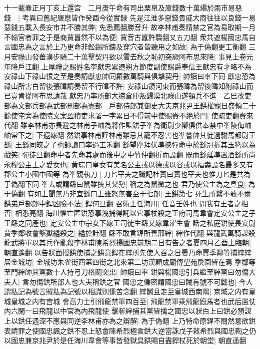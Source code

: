 十一載春正月丁亥上還宫　二月庚午命有司出粟帛及庫錢數十萬緡於兩市易惡錢　|{
	考異曰舊紀唐㦄皆作癸酉今從實録}
先是江淮多惡錢貴戚大商往往以良錢一易惡錢五載入長安市井不勝其弊|{
	先悉薦翻勝音升}
故李林甫奏請禁之官為易取期一月不輸官者罪之于是商賈囂然不以為便|{
	賈音古囂許驕翻又五刀翻}
衆共遮楊國忠馬自言國忠為之言於上乃更命非鈆錫所鑄及穿穴者皆聽用之如故|{
	為于偽翻更工衡翻}
三月安祿山發蕃漢步騎二十萬擊契丹欲以雪去秋之恥初突厥阿布思來降|{
	事見上卷元年降戶江翻}
上厚禮之賜姓名李獻忠累遷朔方節度副使賜爵奉信王獻忠有才略不為安祿山下祿山恨之至是奏請獻忠帥同羅數萬騎與俱擊契丹|{
	帥讀曰率下同}
獻忠恐為祿山所害白留後張暐請奏留不行暐不許|{
	安祿山領河東而張暐為留後暐知附祿山而已豈肯從阿布思請哉}
獻忠乃率所部大掠倉庫叛歸漠北祿山遂頓兵不進　乙巳改吏部為文部兵部為武部刑部為憲部　戶部侍郎兼御史大夫京兆尹王鉷權寵日盛領二十餘使宅旁為使院文案盈積吏求署一字累日不得前中使賜賚不絶於門|{
	使疏吏翻賚來代翻}
雖李林甫亦畏避之林甫子岫為將作監鉷子凖為衛尉少卿俱供奉禁中凖陵侮岫岫常下之|{
	下遐嫁翻}
然鉷事林甫謹林甫雖忌其寵不忍害也凖嘗帥其徒過駙馬都尉王繇|{
	王繇同皎之子也帥讀曰率過工禾翻}
繇望塵拜伏凖挾彈命中於繇冠折其玉簪以為戲笑|{
	彈徒旦翻命中者先命其處而後中之中竹仲翻折而設翻}
既而繇延凖置酒繇所尚永穆公主上之愛女也|{
	黄琮曰皇女有美名公主或以德或以容或以福壽設名最多又有郡公主小國中國等}
為凖親執刀|{
	刀匕宰夫之職記杜蕢曰蕢也宰夫也惟刀匕是共為于偽翻下同}
凖去或謂繇曰鼠雖挾其父勢|{
	稱之為鼠微之也}
君乃使公主為之具食|{
	為于偽翻}
有如上聞無乃非宜繇曰上雖怒無害至于七郎|{
	王鉷第七}
死生所繫不敢不爾鉷弟戶部郎中銲凶險不法|{
	銲何旦翻}
召術士任海川|{
	任音壬姓也}
問我有王者之相否|{
	相悉亮翻}
海川懼亡匿鉷恐事洩捕得託以它事杖殺之王府司馬韋會定安公主之子王繇之同產也|{
	定安公主中宗女下嫁王司徒生繇又嫁韋濯生會}
話之私庭鉷使長安尉賈季鄰收會繫獄縊殺之|{
	縊於計翻}
繇不敢言銲所善邢縡|{
	縡作代翻}
與龍武萬騎謀殺龍武將軍以其兵作亂殺李林甫陳希烈楊國忠前期二日有告之者夏四月乙酉上臨朝|{
	朝直遙翻}
以告狀面授鉷使捕之鉷意銲在縡所先使人召之日晏乃命賈季鄰等捕縡縡居金城坊|{
	金城坊朱雀街西第四街之北來第二坊漢顧成廟傳望苑戾園皆在焉}
季鄰等至門縡帥其黨數十人持弓刀格鬭突出|{
	帥讀曰率}
鉷與楊國忠引兵繼至縡黨曰勿傷大夫人|{
	言勿傷鉷所部人也大夫稱鉷之官}
國忠之傔密謂國忠曰賊有號不可戰也|{
	今人謂私記為號言賊私為記號以相識别傔苦念翻}
縡鬭且走至皇城西南隅|{
	京城之内有皇城皇城之内有宫城}
會高力士引飛龍禁軍四百至|{
	飛龍禁軍乘飛龍廐馬者也武后置仗内六閑一曰飛龍以中官為内飛龍使}
擊斬縡捕其黨皆擒之國忠以狀白上曰鉷必預謀上以鉷任遇深不應與同逆李林甫亦為之辯解|{
	為于偽翻}
上乃特命原銲不問然意欲鉷表請罪之使國忠諷之鉷不忍上怒會陳希烈極言鉷大逆當誅戊子敕希烈與國忠鞫之仍以國忠兼京兆尹於是任海川韋會等事皆發獄具鉷賜自盡銲杖死於朝堂|{
	朝直遥翻}
